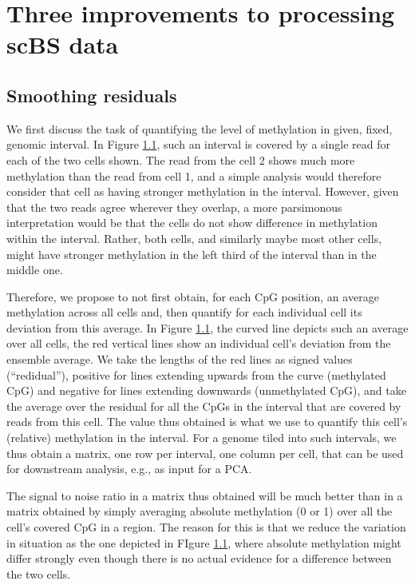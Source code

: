 \documentclass[twocolumn,10pt]{article}
\begin{document}
\section{Three improvements to processing scBS data}

\subsection{Smoothing residuals}

We first discuss the task of quantifying the level of methylation in given, fixed, genomic interval. In Figure \ref{}, such an interval is covered by a single read for each of the two cells shown. The read from the cell 2 shows much more methylation than the read from cell 1, and a simple analysis would therefore consider that cell as having stronger methylation in the interval. However, given that the two reads agree wherever they overlap, a more parsimonous interpretation would be that the cells do not show difference in methylation within the interval. Rather, both cells, and similarly maybe most other cells, might have stronger methylation in the left third of the interval than in the middle one.

Therefore, we propose to not first obtain, for each CpG position, an average methylation across all cells and, then quantify for each individual cell its deviation from this average. In Figure \ref{}, the curved line depicts such an average over all cells, the red vertical lines show an individual cell's deviation from the ensemble average. We take the lengths of the red lines as signed values (``redidual''), positive for lines extending upwards from the curve (methylated CpG) and negative for lines extending downwards (unmethylated CpG), and take the average over the residual for all the CpGs in the interval that are covered by reads from this cell. The value thus obtained is what we use to quantify this cell's (relative) methylation in the interval. For a genome tiled into such intervals, we thus obtain a matrix, one row per interval, one column per cell, that can be used for downstream analysis, e.g., as input for a PCA.

The signal to noise ratio in a matrix thus obtained will be much better than in a matrix obtained by simply averaging absolute methylation (0 or 1) over all the cell's covered CpG in a region. The reason for this is that we reduce the variation in situation as the one depicted in FIgure \ref{}, where absolute methylation might differ strongly even though there is no actual evidence for a difference between the two cells.
\end{document}
